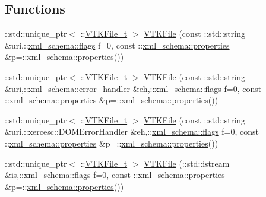 \subsection*{Functions}
\begin{DoxyCompactItemize}
\item 
\+::std\+::unique\+\_\+ptr$<$ \+::\hyperlink{classVTKFile__t}{V\+T\+K\+File\+\_\+t} $>$ \hyperlink{vtk-unstructured_8h_a4052c3602bae47ea585cfbd4f9aef36e}{V\+T\+K\+File} (const \+::std\+::string \&uri,\+::\hyperlink{namespacexml__schema_a0612287d030cb2732d31a45b258fdc87}{xml\+\_\+schema\+::flags} f=0, const \+::\hyperlink{namespacexml__schema_a1a8ebac679580b41baebd62c7d641c1d}{xml\+\_\+schema\+::properties} \&p=\+::\hyperlink{namespacexml__schema_a1a8ebac679580b41baebd62c7d641c1d}{xml\+\_\+schema\+::properties}())
\item 
\+::std\+::unique\+\_\+ptr$<$ \+::\hyperlink{classVTKFile__t}{V\+T\+K\+File\+\_\+t} $>$ \hyperlink{vtk-unstructured_8h_a4f8bbb9a5259858c13e61b8711b58e89}{V\+T\+K\+File} (const \+::std\+::string \&uri,\+::\hyperlink{namespacexml__schema_a0a5d9528e9175cedf199984a8bb64d62}{xml\+\_\+schema\+::error\+\_\+handler} \&eh,\+::\hyperlink{namespacexml__schema_a0612287d030cb2732d31a45b258fdc87}{xml\+\_\+schema\+::flags} f=0, const \+::\hyperlink{namespacexml__schema_a1a8ebac679580b41baebd62c7d641c1d}{xml\+\_\+schema\+::properties} \&p=\+::\hyperlink{namespacexml__schema_a1a8ebac679580b41baebd62c7d641c1d}{xml\+\_\+schema\+::properties}())
\item 
\+::std\+::unique\+\_\+ptr$<$ \+::\hyperlink{classVTKFile__t}{V\+T\+K\+File\+\_\+t} $>$ \hyperlink{vtk-unstructured_8h_a9763e186606b0cf20705b6de959f5268}{V\+T\+K\+File} (const \+::std\+::string \&uri,\+::xercesc\+::\+D\+O\+M\+Error\+Handler \&eh,\+::\hyperlink{namespacexml__schema_a0612287d030cb2732d31a45b258fdc87}{xml\+\_\+schema\+::flags} f=0, const \+::\hyperlink{namespacexml__schema_a1a8ebac679580b41baebd62c7d641c1d}{xml\+\_\+schema\+::properties} \&p=\+::\hyperlink{namespacexml__schema_a1a8ebac679580b41baebd62c7d641c1d}{xml\+\_\+schema\+::properties}())
\item 
\+::std\+::unique\+\_\+ptr$<$ \+::\hyperlink{classVTKFile__t}{V\+T\+K\+File\+\_\+t} $>$ \hyperlink{vtk-unstructured_8h_a28ff18d2139c692ff60322d4e99b2f6b}{V\+T\+K\+File} (\+::std\+::istream \&is,\+::\hyperlink{namespacexml__schema_a0612287d030cb2732d31a45b258fdc87}{xml\+\_\+schema\+::flags} f=0, const \+::\hyperlink{namespacexml__schema_a1a8ebac679580b41baebd62c7d641c1d}{xml\+\_\+schema\+::properties} \&p=\+::\hyperlink{namespacexml__schema_a1a8ebac679580b41baebd62c7d641c1d}{xml\+\_\+schema\+::properties}())

\end{DoxyCompactItemize}

